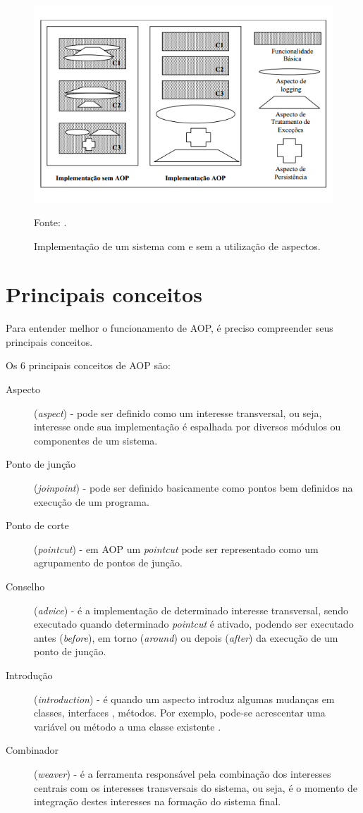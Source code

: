 \documentclass[tc,oneside]{iiufrgs}
\begin{document}
\begin{figure}[ht]
	\centering
	\includegraphics[scale=0.6]{figuras/funcionamentoAOP.png}
	\caption{Implementação de um sistema com e sem a utilização de aspectos.}
	\small{Fonte: \cite{steinmacher2003estudo}.}
	\label{fig:funcionamentoAOP}
\end{figure}

\section{Principais conceitos}

Para entender melhor o funcionamento de AOP, é preciso compreender seus principais conceitos. 

Os 6 principais conceitos de AOP são:

\begin{description}
\item [Aspecto] (\textit{aspect}) - pode ser definido como um interesse transversal, ou seja, interesse onde sua implementação é espalhada por diversos módulos ou componentes de um sistema.
\item [Ponto de junção] (\textit{joinpoint}) - pode ser definido basicamente como pontos bem definidos na execução de um programa.
\item [Ponto de corte] (\textit{pointcut}) - em AOP um \textit{pointcut} pode ser representado como um agrupamento de pontos de junção.
\item [Conselho] (\textit{advice}) - é a implementação de determinado interesse transversal, sendo executado quando determinado \textit{pointcut} é ativado, podendo ser executado antes (\textit{before}), em torno (\textit{around}) ou depois (\textit{after}) da execução de um ponto de junção.
\item [Introdução] (\textit{introduction}) - é quando um aspecto introduz algumas mudanças em classes, interfaces , métodos. Por exemplo, pode-se acrescentar uma variável ou método a uma classe existente  \cite{laddad2003aspectj}.
\item [Combinador] (\textit{weaver}) - é a ferramenta responsável pela combinação dos interesses centrais com os interesses transversais do sistema, ou seja,  é o momento de integração destes interesses na formação do sistema final.

\end{description}
\end{document}
